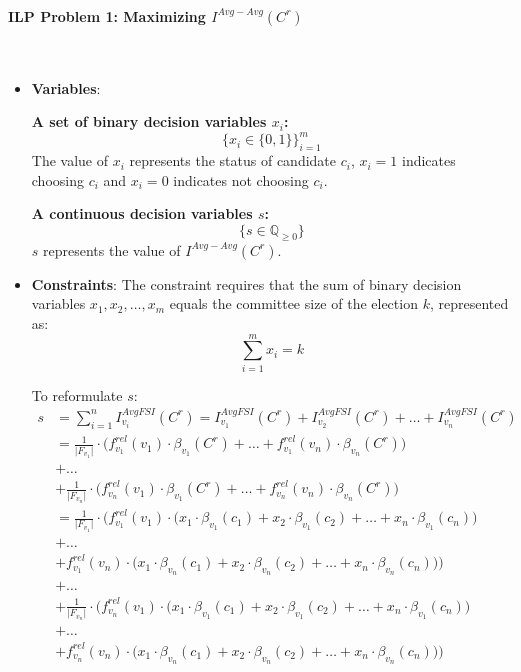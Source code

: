 \documentclass{article}
\begin{document}
\paragraph*{ILP Problem 1: Maximizing  $I^{Avg-Avg}(C^{r})$}
\
\begin{itemize}
  \item \textbf{Variables}: 

\textbf{A set of binary decision variables $x_i$:} \[ \bigg\{ x_i \in \{0, 1\} \bigg\}_{i=1}^m \] The value of $x_i$ represents the status of candidate $c_i$, \(x_i = 1\) indicates choosing $c_i$ and \(x_i = 0\) indicates not choosing $c_i$.


\textbf{A continuous decision variables $s$:} 
\[ \bigg\{ s\in \mathbb{Q}_{\geq 0} \bigg\}\] 
$s$ represents the value of $I^{Avg-Avg}(C^{r})$.
    \item \textbf{Constraints}:
The constraint requires that the sum of binary decision variables \(x_1, x_2, \ldots, x_m\) equals the committee size of the election \(k\), represented as:
\begin{equation} \sum_{i=1}^m x_i = k     \label{eq:ilpavgavg1}
\end{equation}

To reformulate $s$:
\begin{equation}
\begin{split}
 s & = \sum_{i=1}^{n} I_{v_i}^{AvgFSI}(C^{r})  = I_{v_1}^{AvgFSI}(C^{r}) + I_{v_2}^{AvgFSI}(C^{r}) +\dots+I_{v_n}^{AvgFSI}(C^{r}) \\
& =  \frac{1}{\vert F_{v_1} \vert}\cdot \Big( f_{v_1}^{rel}(v_1) \cdot \beta_{v_1}(C^{r})+\dots+f_{v_1}^{rel}(v_n) \cdot \beta_{v_n}(C^{r})\Big)\\
& +\dots \\
& +\frac{1}{\vert F_{v_n} \vert}\cdot \Big(f_{v_n}^{rel}(v_1) \cdot \beta_{v_1}(C^{r})+\dots+f_{v_n}^{rel}(v_n) \cdot \beta_{v_n}(C^{r})\Big)\\
& = \frac{1}{\vert F_{v_1} \vert}\cdot \Big(f_{v_1}^{rel}(v_1)\cdot \big(x_1\cdot \beta_{v_1}(c_1)+x_2\cdot \beta_{v_1}(c_2)+\dots +x_n\cdot \beta_{v_1}(c_n)\big) \\
& +\dots \\
& +f_{v_1}^{rel}(v_n)\cdot \big(x_1\cdot \beta_{v_n}(c_1)+x_2\cdot \beta_{v_n}(c_2)+\dots +x_n\cdot \beta_{v_n}(c_n)\big)\Big) \\
& +\dots \\
& +\frac{1}{\vert F_{v_n} \vert}\cdot \Big(f_{v_n}^{rel}(v_1)\cdot \big(x_1\cdot \beta_{v_1}(c_1)+x_2\cdot \beta_{v_1}(c_2)+\dots +x_n\cdot \beta_{v_1}(c_n)\big) \\
& +\dots \\
& +f_{v_n}^{rel}(v_n)\cdot \big(x_1\cdot \beta_{v_n}(c_1)+x_2\cdot \beta_{v_n}(c_2)+\dots +x_n\cdot \beta_{v_n}(c_n)\big)\Big)
\end{split}
\end{equation}
  

\end{itemize}
\end{document}
